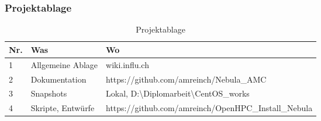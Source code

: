 \subsubsection{Projektablage}
\begin{table}[H]
\centering
\begin{tabular}{p{1cm}p{4cm}p{11cm}}
\hline
\rowcolor{heading}\textbf{Nr.} & \textbf{Was} & \textbf{Wo} \\\hline
1 & Allgemeine Ablage& wiki.influ.ch \\\hline
2 & Dokumentation & https://github.com/amreinch/Nebula\_AMC \\\hline
3 & Snapshots & Lokal, D:\textbackslash Diplomarbeit\textbackslash CentOS\_works \\\hline
4 & Skripte, Entwürfe & https://github.com/amreinch/OpenHPC\_Install\_Nebula \\\hline
\end{tabular}
\caption{Projektablage}
\end{table}
